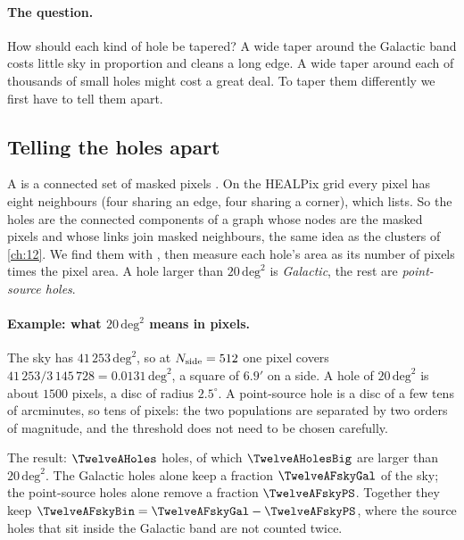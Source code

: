 \paragraph{The question.} How should each kind of hole be tapered? A wide taper around the Galactic band
costs little sky in proportion and cleans a long edge. A wide taper around each of thousands of small holes
might cost a great deal. To taper them differently we first have to tell them apart.

\subsection{Telling the holes apart}
\label{13a:sec:holes}

A  is a connected set of masked pixels . On the HEALPix grid every pixel has eight
neighbours (four sharing an edge, four sharing a corner), which  lists. So the
holes are the connected components of a graph whose nodes are the masked pixels and whose links join
masked neighbours, the same idea as the clusters of \cref{ch:12}. We find them with
, then measure each hole's area as its number of pixels
times the pixel area. A hole larger than $20\,\mathrm{deg}^2$ is \emph{Galactic}, the rest are
\emph{point-source holes}.

\paragraph{Example: what $20\,\mathrm{deg}^2$ means in pixels.} The sky has $41\,253\,\mathrm{deg}^2$, so at $N_{\rm side}=512$ one
pixel covers $41\,253/3\,145\,728=0.0131\,\mathrm{deg}^2$, a square of $6.9'$ on a side. A hole of $20\,\mathrm{deg}^2$ is about
$1500$ pixels, a disc of radius $2.5^\circ$. A point-source hole is a disc of a few tens of arcminutes, so
tens of pixels: the two populations are separated by two orders of magnitude, and the threshold does not
need to be chosen carefully.

The result: $\TwelveAHoles$ holes, of which $\TwelveAHolesBig$ are larger than $20\,\mathrm{deg}^2$. The Galactic holes
alone keep a fraction $\TwelveAFskyGal$ of the sky; the point-source holes alone remove a fraction
$\TwelveAFskyPS$. Together they keep $\TwelveAFskyBin=\TwelveAFskyGal-\TwelveAFskyPS$, where the source holes that
sit inside the Galactic band are not counted twice.

